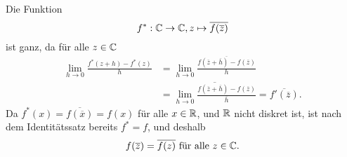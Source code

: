 \documentclass[a4paper,10pt]{article}
\begin{document}
\subsection{}
Die Funktion
\[
 f^* : \mathbb{C} \to \mathbb{C}, z \mapsto \overline{f(\overline{z})}
\]
ist ganz, da für alle $z \in \mathbb{C}$
\begin{align*}
 \lim_{h \to 0} \frac{f^*(z+h)-f^*(z)}{h}
 &= \lim_{h \to 0} \frac{\overline{f(\overline{z}+\overline{h})-f(\overline{z})}}{h} \\
 &= \overline{ \lim_{h \to 0} \frac{f(\overline{z}+\overline{h})-f(\overline{z})}{\overline{h}} }
 = \overline{f'(\overline{z})}.
\end{align*}
Da $f^*(x) = \overline{f(\overline{x})} = f(x)$ für alle $x \in \mathbb{R}$, und $\mathbb{R}$ nicht diskret ist, ist nach dem Identitätssatz bereits $f^* = f$, und deshalb
\[
 f(\overline{z}) = \overline{f(z)} \text{ für alle } z \in \mathbb{C}.
\]
\end{document}
